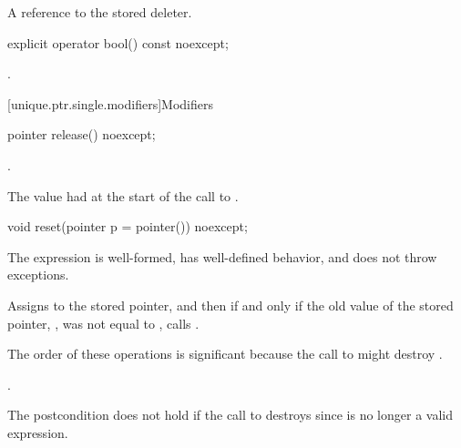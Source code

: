 \begin{itemdescr}
\pnum
\returns
A reference to the stored deleter.
\end{itemdescr}

%
\begin{itemdecl}
explicit operator bool() const noexcept;
\end{itemdecl}

\begin{itemdescr}
\pnum
\returns
{}.
\end{itemdescr}

[unique.ptr.single.modifiers]{Modifiers}

%
\begin{itemdecl}
pointer release() noexcept;
\end{itemdecl}

\begin{itemdescr}
\pnum
\ensures
{}.

\pnum
\returns
The value  had at the start of
the call to .
\end{itemdescr}

%
\begin{itemdecl}
void reset(pointer p = pointer()) noexcept;
\end{itemdecl}

\begin{itemdescr}
\pnum
\expects
The expression  is well-formed,
has well-defined behavior, and does not throw exceptions.

\pnum
\effects
Assigns  to the stored pointer, and then if and only if the old value of the
stored pointer, , was not equal to , calls
.
\begin{note}
The order of these operations is significant
because the call to  might destroy .
\end{note}

\pnum
\ensures
{}.
\begin{note}
The postcondition does not hold if the call to 
destroys  since  is no longer a valid expression.
\end{note}
\end{itemdescr}

